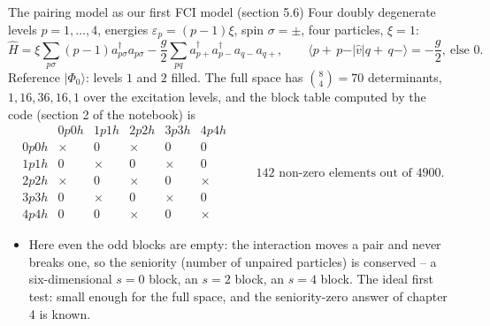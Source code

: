 \documentclass[aspectratio=169,10pt]{beamer}
\newcommand{\ket}[1]{\vert #1\rangle}
\newcommand{\element}[3]{\langle #1\vert #2\vert #3\rangle}
\begin{document}
\begin{frame}{The pairing model as our first FCI model (section 5.6)}
  \small
  Four doubly degenerate levels $p=1,\dots,4$, energies $\varepsilon_p=(p-1)\xi$, spin $\sigma=\pm$, four particles, $\xi=1$:
  \[
    \hat{H}=\xi\sum_{p\sigma}(p-1)a^{\dagger}_{p\sigma}a_{p\sigma}
    -\frac{g}{2}\sum_{pq}a^{\dagger}_{p+}a^{\dagger}_{p-}a_{q-}a_{q+},
    \qquad\element{p+\,p-}{\hat{v}}{q+\,q-}=-\frac{g}{2},\ \text{else }0 .
  \]
  Reference $\ket{\Phi_0}$: levels $1$ and $2$ filled. The full space has $\binom84=70$ determinants, $1,16,36,16,1$ over the excitation levels, and the block table computed by the code (section 2 of the notebook) is
  \[
    \begin{array}{c|ccccc}
       & 0p0h & 1p1h & 2p2h & 3p3h & 4p4h\\
      \hline
      0p0h & \times & 0 & \times & 0 & 0\\
      1p1h & 0 & \times & 0 & \times & 0\\
      2p2h & \times & 0 & \times & 0 & \times\\
      3p3h & 0 & \times & 0 & \times & 0\\
      4p4h & 0 & 0 & \times & 0 & \times
    \end{array}
    \qquad\text{$142$ non-zero elements out of $4900$.}
  \]
  \begin{itemize}
    \item Here even the odd blocks are empty: the interaction moves a pair and never breaks one, so the \alert{seniority} (number of unpaired particles) is conserved -- a six-dimensional $s=0$ block, an $s=2$ block, an $s=4$ block. The ideal first test: small enough for the full space, and the seniority-zero answer of chapter 4 is known.
  \end{itemize}
\end{frame}
\end{document}
